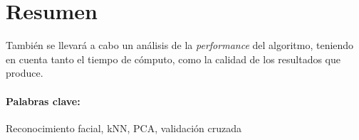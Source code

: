 

\section{Resumen} %



También se llevará a cabo un análisis de la \textit{performance} del algoritmo, teniendo en cuenta tanto el tiempo de cómputo, como la calidad de los resultados que produce.

\paragraph{Palabras clave:} %
Reconocimiento facial, kNN, PCA, validación cruzada
% 

